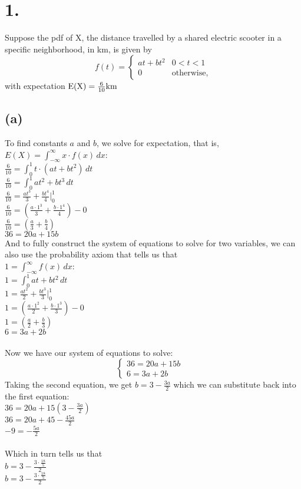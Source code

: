 \documentclass{article}
\begin{document}
\thispagestyle{firstpageheader}

\section*{1.}
{\Large 

Suppose the pdf of X, the distance travelled by a shared electric scooter in a specific neighborhood, in km, is given by  
\[f(t)=\begin{cases}at+bt^2& 0<t<1\\0& \text{otherwise,}  \end{cases}\]
with expectation $\rm E(X)=\frac 6{10} km$

\subsection*{(a)}
To find constants $a$ and $b$, we solve for expectation, that is, \\
$E(X) = \int_{-\infty}^{\infty} x \cdot f(x) \, dx $: \\ 
$\frac{6}{10} = \int_{0}^{1} t \cdot (at + bt^2) \, dt$ \\
$\frac{6}{10} = \int_{0}^{1} at^2 + bt^3 \, dt$ \\
$\frac{6}{10} = \frac{at^3}{3} + \frac{bt^4}{4} |_{0}^{1}$ \\
$\frac{6}{10} = (\frac{a \cdot 1^3}{3} + \frac{b \cdot 1^4}{4}) - 0$ \\
$\frac{6}{10} = (\frac{a}{3} + \frac{b}{4})$ \\
$36 = 20a + 15b$ \\
And to fully construct the system of equations to solve for two variables, we can also use the probability axiom that tells us that \\
$1 = \int_{-\infty}^{\infty} f(x) \, dx $: \\ 
$1 = \int_{0}^{1} at + bt^2 \, dt$ \\
$1 = \frac{at^2}{2} + \frac{bt^3}{3} |_{0}^{1}$ \\
$1 = (\frac{a \cdot 1^2}{2} + \frac{b \cdot 1^3}{3}) - 0$ \\
$1 = (\frac{a}{2} + \frac{b}{3})$ \\
$6 = 3a + 2b$ \\ \\ 
Now we have our system of equations to solve:
\[\begin{cases}
36 = 20a + 15b&\\
6 = 3a + 2b& 
\end{cases}\]
Taking the second equation, we get $b = 3 - \frac{3a}{2}$ which we can substitute back into the first equation: \\ 
$36 = 20a + 15(3 - \frac{3a}{2})$ \\
$36 = 20a + 45 - \frac{45a}{2}$ \\
$-9 = - \frac{5a}{2}$ \\
 \\ 
Which in turn tells us that \\ 
$b = 3 - \frac{3 \cdot \frac{18}{5}}{2}$ \\ 
$b = 3 - \frac{3 \cdot \frac{18}{5}}{2}$ \\ 

}
\end{document}
